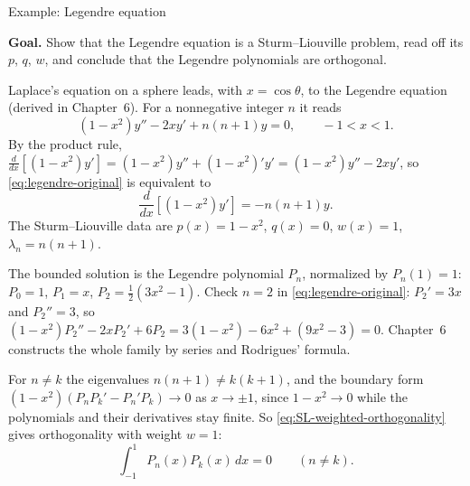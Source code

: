 \documentclass[11pt]{beamer}
\begin{document}
\begin{frame}[allowframebreaks=0.98]{Example: Legendre equation}
\footnotesize

\textbf{Goal.} Show that the Legendre equation is a Sturm--Liouville problem, read off its
$p$, $q$, $w$, and conclude that the Legendre polynomials are orthogonal.

Laplace's equation on a sphere leads, with $x=\cos\theta$, to the Legendre equation (derived in
Chapter~6). For a nonnegative integer $n$ it reads
\begin{equation}
  (1-x^2)y''-2xy'+n(n+1)y=0,
  \qquad -1<x<1.
  \label{eq:legendre-original}
\end{equation}
By the product rule, $\frac{d}{dx}\left[(1-x^2)y'\right]=(1-x^2)y''+(1-x^2)'y'=(1-x^2)y''-2xy'$,
so \eqref{eq:legendre-original} is equivalent to
\begin{equation}
  \frac{d}{dx}\left[(1-x^2)y'\right]
  =-n(n+1)y.
  \label{eq:legendre-SL}
\end{equation}
The Sturm--Liouville data are $p(x)=1-x^2$, $q(x)=0$, $w(x)=1$, $\lambda_n=n(n+1)$.

The bounded solution is the Legendre polynomial $P_n$, normalized by $P_n(1)=1$:
$P_0=1$, $P_1=x$, $P_2=\tfrac12(3x^2-1)$. Check $n=2$ in \eqref{eq:legendre-original}:
$P_2'=3x$ and $P_2''=3$, so
$(1-x^2)P_2''-2xP_2'+6P_2=3(1-x^2)-6x^2+(9x^2-3)=0$. Chapter~6 constructs the whole
family by series and Rodrigues' formula.

For $n\ne k$ the eigenvalues $n(n+1)\ne k(k+1)$, and the boundary form
$(1-x^2)(P_nP_k'-P_n'P_k)\to0$ as $x\to\pm1$, since $1-x^2\to0$ while the
polynomials and their derivatives stay finite. So \eqref{eq:SL-weighted-orthogonality} gives
orthogonality with weight $w=1$:
\begin{equation}
  \int_{-1}^{1}P_n(x)P_k(x)\,dx=0
  \qquad(n\neq k).
  \label{eq:legendre-orth}
\end{equation}
\end{frame}
\end{document}
